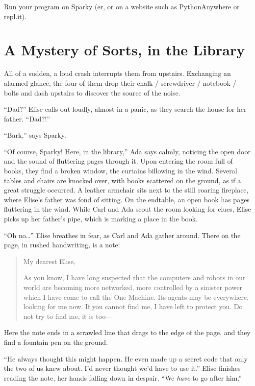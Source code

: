 \documentclass{article}
\begin{document}
Run your program on Sparky (er, or on a website such
as PythonAnywhere or repl.it).

\section{A Mystery of Sorts, in the Library}

All of a sudden, a loud crash interrupts them from upstairs.
Exchanging an alarmed glance, the four of them drop their
chalk / screwdriver / notebook / bolts and dash upstairs to discover
the source of the noise.

``Dad?'' Elise calls out loudly, almost in a panic, as they
search the house for her father. ``Dad?!''

``Bark,'' says Sparky.

``Of course, Sparky! Here, in the library,'' Ada says calmly, noticing the open
door and the sound of fluttering pages through it.
Upon entering the
room full of books, they find a broken window, the curtains
billowing in the wind. Several tables and chairs are
knocked over, with books scattered on the ground, as if a
great struggle occurred. A leather armchair sits next to the
still roaring fireplace, where Elise's father was fond of sitting.
On the endtable, an open book has pages fluttering in
the wind. While Carl and Ada scout the room looking for
clues, Elise picks up her father's pipe, which is marking
a place in the book.

``Oh no\ldots'' Elise breathes in fear, as Carl and Ada
gather around. There on the page, in rushed handwriting,
is a note:

\begin{quote}
My dearest Elise,

As you know, I have long suspected that the computers and
robots in
our world are becoming more networked, more controlled by
a sinister power which I have come to call the One Machine.
Its agents may be everywhere, looking for me now.
If you cannot find me, I have left to protect you.
Do not try to find me, it is too---
\end{quote}

Here the note ends in a scrawled line that drags to the
edge of the page, and they find a fountain pen on the
ground.

``He always thought this might happen. He even made up a
secret code that only the two of us knew about. I'd never
thought we'd have to use it.'' Elise finishes reading
the note, her hands falling down in despair.
``We \emph{have} to go after him.''
\end{document}
